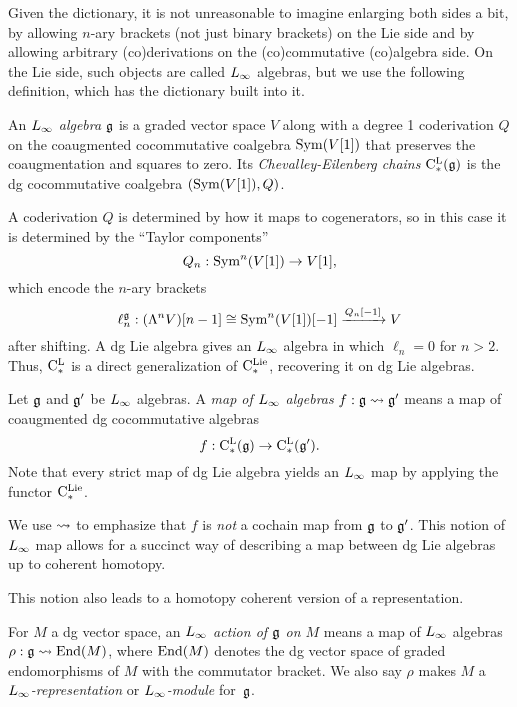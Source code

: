 Given the dictionary, it is not unreasonable to imagine enlarging both sides a bit, 
by allowing $n$-ary brackets (not just binary brackets) on the Lie side
and by allowing arbitrary (co)derivations on the (co)commutative (co)algebra side.
On the Lie side, such objects are called $\L8$ algebras,
but we use the following definition, which has the dictionary built into it.

\begin{dfn}
An {\em $\L8$ algebra} $\mathfrak g$ is a graded vector space $V$ along with
a degree 1 coderivation $Q$ on the coaugmented cocommutative coalgebra
${\rm Sym}(V[1])$ that preserves the coaugmentation and squares to zero.
Its {\em Chevalley-Eilenberg chains} ${\rm C}^{\rm L}_*(\mathfrak g)$ is the dg cocommutative
coalgebra $({\rm Sym}(V[1]),Q)$.
\end{dfn}

A coderivation $Q$ is determined by how it maps to cogenerators, 
so in this case it is determined by the ``Taylor components''
\[
Q_n: {\rm Sym}^n(V[1]) \to V[1],
\]
which encode the $n$-ary brackets
\[
\ell_n^\mathfrak g: (\Lambda^n V)[n-1] \cong {\rm Sym}^n(V[1])[-1] \xrightarrow{Q_n[-1]} V
\]
after shifting.
A dg Lie algebra gives an $\L8$ algebra in which $\ell_n = 0$ for $n > 2$.
Thus, ${\rm C}^{\rm L}_*$ is a direct generalization of ${\rm C}^{\rm Lie}_*$, recovering it on dg Lie algebras.

\begin{dfn}
Let $\mathfrak g$ and $\mathfrak g'$ be $\L8$ algebras.
A {\em map of $\L8$ algebras} $f : \fg \l8to \fg'$ means a map of coaugmented dg cocommutative algebras
\[
f: {\rm C}^{\rm L}_*(\mathfrak g) \to {\rm C}^{\rm L}_*(\mathfrak g').
\]
Note that every strict map of dg Lie algebra yields an $\L8$ map by applying the functor ${\rm C}^{\rm Lie}_*$.
\end{dfn}

We use $\l8to$ to emphasize that $f$ is {\em not} a cochain map from $\mathfrak g$ to $\mathfrak g'$.
This notion of $\L8$ map allows for a succinct way of describing a map between dg Lie algebras up to coherent homotopy.

This notion also leads to a homotopy coherent version of a representation.

\begin{dfn}
For $M$ a dg vector space, an {\em $\L8$ action of $\mathfrak g$ on $M$} means a map of $\L8$ algebras
$\rho: \fg \l8to \End(M)$, where ${\rm End}(M)$ denotes the dg vector space of graded endomorphisms of $M$
with the commutator bracket. We also say $\rho$ makes $M$ a {\em $\L8$-representation} or {\em $\L8$-module}
for~$\mathfrak g$.
\end{dfn}

